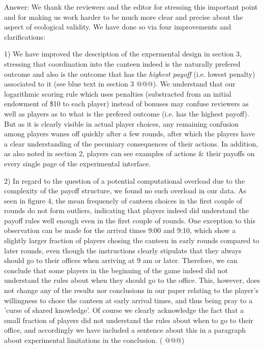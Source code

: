 \documentclass{article}
\newenvironment{robin}{\smallskip \noindent \color{red!10!green!50!blue}}{\color{black}\smallskip}
\begin{document}
\begin{robin}
Answer: We thank the reviewers and the editor for stressing this important point and for making us work harder to be much more clear and precise about the aspect of ecological validity. We have done so via four improvements and clarifications:

1) We have improved the description of the expermental design in section 3, stressing that coordination into the canteen indeed is the naturally prefered outcome and also is the outcome that has the \emph{highest payoff} (i.e. lowest penalty) associated to it (see blue text in section 3 @@@). We understand that our logarithmic scoring rule which uses penalties (substracted from an initial endowment of \$10 to each player) instead of bonuses may confuse reviewers as well as players as to what is the prefered outcome (i.e. has the highest payoff). But as it is clearly visible in actual player choices, any remaining confusion among players wanes off quickly after a few rounds, after which the players have a clear understanding of the pecuniary consequences of their actions. In addition, as also noted in section 2, players can see examples of actions \& their payoffs on every single page of the experimental interface.  

2) In regard to the question of a potential computational overload due to the complexity of the payoff structure, we found no such overload in our data. As seen in figure 4, the mean frequencly of canteen choices in the first couple of rounds do not form outliers, indicating that players indeed did understand the payoff rules well enough even in the first couple of rounds. One exception to this observation can be made for the arrival times 9:00 and 9:10, which show a slightly larger fraction of players chosing the canteen in early rounds compared to later rounds, even though the instructions clearly stipulate that they always should go to their offices when arriving at 9 am or later. Therefore, we can conclude that some players in the beginning of the game indeed did not understand the rules about when they should go to the office. This, however, does not change any of the results nor conclusions in our paper relating to the player's willingness to chose the canteen at early arrival times, and thus being pray to a 'curse of shared knowledge'. Of course we clearly acknowledge the fact that a small fraction of players did not understand the rules about when to go to their office, and accordingly we have included a sentence about this in a paragraph about experimental limitations in the conclusion. ( @@@)


\end{robin}
\end{document}
